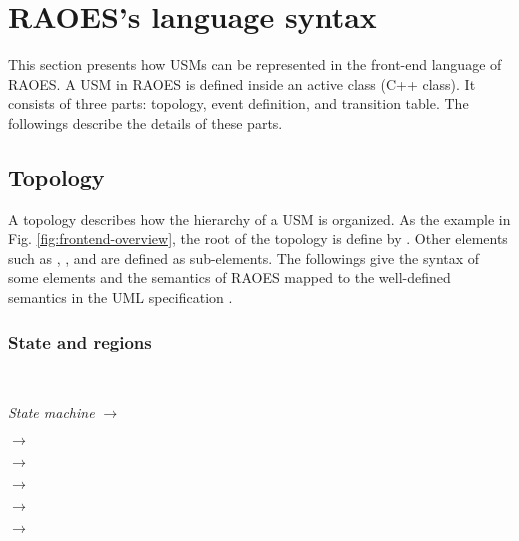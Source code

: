 \section{RAOES's language syntax}
\label{sec:syntax}
This section presents how USMs can be represented in the front-end language of RAOES.
A USM in RAOES is defined inside an active class (C++ class).
It consists of three parts: topology, event definition, and transition table.
The followings describe the details of these parts.
\subsection{Topology}
A topology describes how the hierarchy of a USM is organized.
As the example in Fig. \ref{fig:frontend-overview}, the root of the topology is define by .
Other elements such as , , and  are defined as sub-elements.
The followings give the syntax of some elements and the semantics of RAOES mapped to the well-defined semantics in the UML specification \cite{OMG2015}.

\subsubsection{State and regions} ~\\

\textit{State machine} $\rightarrow$  

 $\rightarrow$  

 $\rightarrow$ 

 $\rightarrow$  

 $\rightarrow$ 

 $\rightarrow$ 

